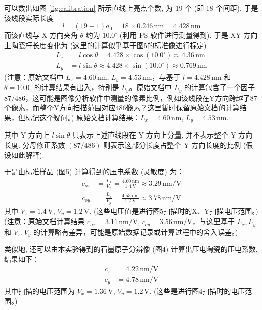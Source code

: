 \documentclass[12pt]{ctexart} %
\begin{document}
可以数出如图 \ref{fig:calibration} 所示直线上亮点个数, 为 19 个 (即 18 个间距), 于是该线段实际长度
\[ l = (19 - 1)a_0 = 18 \times 0.246 \, \text{nm} = 4.428 \, \text{nm} \] %
而该直线与 X 方向夹角 \( \theta \) 约为 \( 10.0^\circ \) (利用 PS 软件进行测量得到).
于是 XY 方向上陶瓷杆长度变化为 (这里的计算似乎基于图5的标准像进行标定)
\begin{align}
 L_x &= l \cos \theta = 4.428 \times \cos(10.0^\circ) \approx 4.36 \, \text{nm} \label{eq:Lx} \\ %
 L_y &= l \sin \theta \approx 4.428 \times \sin(10.0^\circ) \approx 0.769 \, \text{nm} \label{eq:Ly} %
\end{align}
(注意：原始文档中 \(L_x = 4.60\,\text{nm}\), \(L_y = 4.53\,\text{nm}\)，与基于 \(l=4.428\,\text{nm}\) 和 \(\theta=10.0^\circ\) 的计算结果有出入，特别是 \(L_y\)。原始文档中 \(L_y\) 的计算包含了一个因子 \(87/486\)，这可能是图像分析软件中测量的像素比例，例如该线段在Y方向跨越了87个像素，而整个Y方向扫描范围对应486像素？这里暂时保留原始文档的计算结果，但标记这个疑问。)
原始文档计算结果：\( L_x = 4.60 \, \text{nm} \), \( L_y = 4.53 \, \text{nm} \).

其中 Y 方向上 \( l \sin \theta \) 只表示上述直线段在 Y 方向上分量, 并不表示整个 Y 方向长度. 分母修正系数 \( (87/486) \) 则表示这部分长度占整个 Y 方向长度的比例 (假设如此解释).

于是由标准样品 (图5) 计算得到的压电系数 (灵敏度) 为：
\begin{align}
 c_{ox} &= \frac{L_x}{V_x} = \frac{4.60 \, \text{nm}}{1.4 \, \text{V}} \approx 3.29 \, \text{nm/V} \label{eq:cox} \\ %
 c_{oy} &= \frac{L_y}{V_y} = \frac{4.53 \, \text{nm}}{1.2 \, \text{V}} \approx 3.78 \, \text{nm/V} \label{eq:coy} %
\end{align}
其中 \( V_x = 1.4 \, \text{V} \), \( V_y = 1.2 \, \text{V} \). (这些电压值是进行图5扫描时的X、Y扫描电压范围。) (注意：原始文档计算结果 \(c_{ox}=3.11\,\text{nm/V}\), \(c_{oy}=3.56\,\text{nm/V}\)，与这里基于 \(L_x, L_y\) 和 \(V_x, V_y\) 的计算略有差异，可能是原始数据记录或计算过程中的舍入误差。)

类似地, 还可以由本实验得到的石墨原子分辨像 (图4) 计算出压电陶瓷的压电系数, 结果如下：
\begin{align} %
 c_x &= 4.22 \, \text{nm/V} \label{eq:cx_exp} \\
 c_y &= 4.78 \, \text{nm/V} \label{eq:cy_exp}
\end{align}
其中扫描的电压范围为 \( V_x = 1.36 \, \text{V} \), \( V_y = 1.2 \, \text{V} \). (这些是进行图4扫描时的电压范围。)
\end{document}
